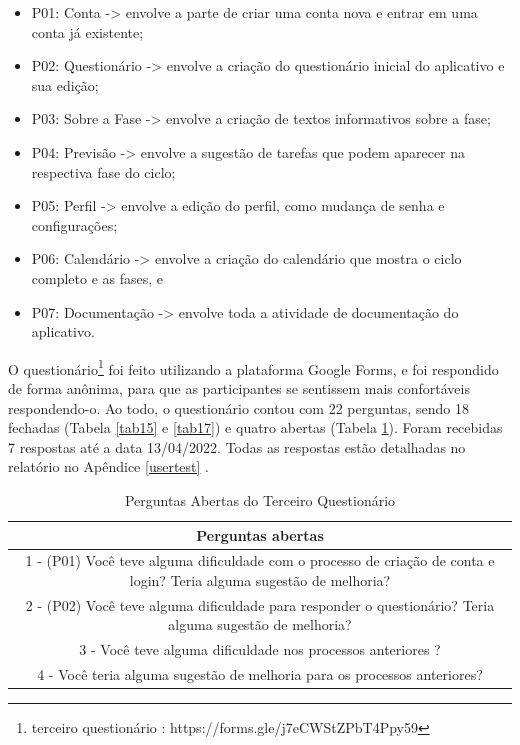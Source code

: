 \begin{itemize}
\item P01: Conta -> envolve a parte de criar uma conta nova e entrar em uma conta já existente;
\item P02: Questionário -> envolve a criação do questionário inicial do aplicativo e sua edição;
\item P03: Sobre a Fase -> envolve a criação de textos informativos sobre a fase;
\item P04: Previsão -> envolve a sugestão de tarefas que podem aparecer na respectiva fase do ciclo;
\item P05: Perfil -> envolve a edição do perfil, como mudança de senha e configurações;
\item P06: Calendário -> envolve a criação do calendário que mostra o ciclo completo e as fases, e
\item P07: Documentação -> envolve toda a atividade de documentação do aplicativo.

\end{itemize}

O questionário\footnote{terceiro questionário : https://forms.gle/j7eCWStZPbT4Ppy59} foi feito utilizando a plataforma Google Forms, 
e foi respondido de forma anônima, para que as
participantes se sentissem mais confortáveis respondendo-o. Ao todo, o questionário contou com 22 perguntas, sendo 18 fechadas 
(Tabela \ref{tab15} e \ref{tab17}) e 
quatro abertas (Tabela \ref{tab16}). Foram recebidas 7 respostas até a data 13/04/2022. Todas as respostas estão 
detalhadas no relatório no Apêndice \ref{usertest} .

\begin{table}[ht]
    \centering
    \caption{Perguntas Abertas do Terceiro Questionário}
    \label{tab16}
    \begin{tabular}{c}
        \toprule
        \textbf{Perguntas abertas} \\
        \midrule     
        \begin{minipage} [t] {1\textwidth} 1 - (P01) Você teve alguma dificuldade com o processo de criação de conta e login? Teria alguma sugestão de melhoria?\end{minipage} \\
        \midrule
        \begin{minipage} [t] {1\textwidth} 2 - (P02) Você teve alguma dificuldade para responder o questionário? Teria alguma sugestão de melhoria?\end{minipage}\\
        \midrule
        \begin{minipage} [t] {1\textwidth} 3 - Você teve alguma dificuldade nos processos anteriores ?  \end{minipage}\\
        \midrule
        \begin{minipage} [t] {1\textwidth} 4 - Você teria alguma sugestão de melhoria para os processos anteriores? \end{minipage}\\
        \bottomrule
    \end{tabular} 
\end{table}

